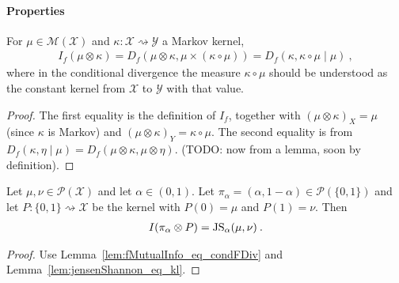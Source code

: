 \paragraph{Properties}

\begin{lemma}
  \label{lem:fMutualInfo_eq_condFDiv}
  For $\mu \in \mathcal M(\mathcal X)$ and $\kappa : \mathcal X \rightsquigarrow \mathcal Y$ a Markov kernel,
  \begin{align*}
  I_f(\mu \otimes \kappa)
  = D_f(\mu \otimes \kappa, \mu \times (\kappa \circ \mu))
  = D_f(\kappa, \kappa \circ \mu \mid \mu)
  \: ,
  \end{align*}
  where in the conditional divergence the measure $\kappa \circ \mu$ should be understood as the constant kernel from $\mathcal X$ to $\mathcal Y$ with that value.
\end{lemma}

\begin{proof}%
\uses{}
The first equality is the definition of $I_f$, together with $(\mu \otimes \kappa)_X = \mu$ (since $\kappa$ is Markov) and $(\mu \otimes \kappa)_Y = \kappa \circ \mu$.
The second equality is from $D_f(\kappa, \eta \mid \mu) = D_f(\mu \otimes \kappa, \mu \otimes \eta)$. (TODO: now from a lemma, soon by definition).
\end{proof}


\begin{lemma}
  \label{lem:mutualInfo_eq_jensenShannon}
  Let $\mu, \nu \in \mathcal P(\mathcal X)$ and let $\alpha \in (0, 1)$. Let $\pi_\alpha = (\alpha, 1 - \alpha) \in \mathcal P(\{0,1\})$ and let $P : \{0,1\} \rightsquigarrow \mathcal X$ be the kernel with $P(0) = \mu$ and $P(1) = \nu$. Then
  \begin{align*}
  I(\pi_\alpha \otimes P) = \operatorname{JS}_\alpha(\mu, \nu) \: .
  \end{align*}
\end{lemma}

\begin{proof}%
{}
Use Lemma~\ref{lem:fMutualInfo_eq_condFDiv} and Lemma~\ref{lem:jensenShannon_eq_kl}.
\end{proof}